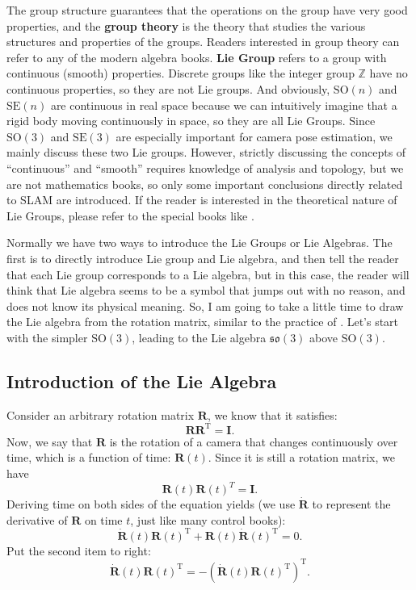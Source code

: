 The group structure guarantees that the operations on the group have very good properties, and the \textbf{group theory} is the theory that studies the various structures and properties of the groups. Readers interested in group theory can refer to any of the modern algebra books. \textbf{Lie Group} refers to a group with continuous (smooth) properties. Discrete groups like the integer group $\mathbb{Z}$ have no continuous properties, so they are not Lie groups. And obviously, $\mathrm{SO}(n)$ and $\mathrm{SE}(n)$ are continuous in real space because we can intuitively imagine that a rigid body moving continuously in space, so they are all Lie Groups. Since $\mathrm{SO}(3)$ and $\mathrm{SE}(3)$ are especially important for camera pose estimation, we mainly discuss these two Lie groups. However, strictly discussing the concepts of ``continuous'' and ``smooth'' requires knowledge of analysis and topology, but we are not mathematics books, so only some important conclusions directly related to SLAM are introduced. If the reader is interested in the theoretical nature of Lie Groups, please refer to the special books like \cite{Varadarajan2013}.

Normally we have two ways to introduce the Lie Groups or Lie Algebras. The first is to directly introduce Lie group and Lie algebra, and then tell the reader that each Lie group corresponds to a Lie algebra, but in this case, the reader will think that Lie algebra seems to be a symbol that jumps out with no reason, and does not know its physical meaning. So, I am going to take a little time to draw the Lie algebra from the rotation matrix, similar to the practice of \cite{Ma2012}. Let's start with the simpler $\mathrm{SO}(3)$, leading to the Lie algebra $\mathfrak{so}(3)$ above $\mathrm{SO}(3)$.

\subsection{Introduction of the Lie Algebra}
Consider an arbitrary rotation matrix $\mathbf{R}$, we know that it satisfies:
\begin{equation}
\mathbf{R} \mathbf{R}^\mathrm{T}=\mathbf{I}.
\end{equation}
Now, we say that $\mathbf{R}$ is the rotation of a camera that changes continuously over time, which is a function of time: $\mathbf{R}(t)$. Since it is still a rotation matrix, we have
\[
\mathbf{R}(t) \mathbf{R}(t) ^T = \mathbf{I}.
\]
Deriving time on both sides of the equation yields (we use $\dot{\mathbf{R}}$ to represent the derivative of $\mathbf{R}$ on time $t$, just like many control books):
\[
\dot{\mathbf{R}} (t) \mathbf{R} {(t)^\mathrm{T}} + \mathbf{R} (t) \dot{\mathbf{R}} {(t) ^\mathrm{T}} = 0.
\]
Put the second item to right:
\begin{equation}
\dot{\mathbf{R}} (t) \mathbf{R} {(t)^\mathrm{T}} = - \left( \dot{\mathbf{R}} (t) \mathbf{R} {(t)^\mathrm{T}} \right)^\mathrm{T} .
\end{equation}

